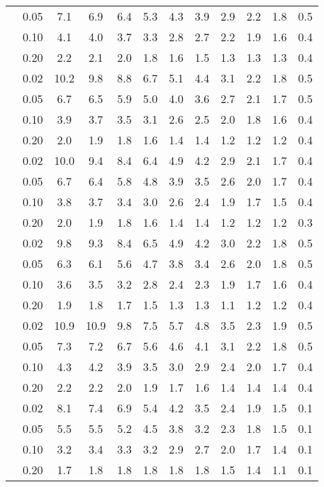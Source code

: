 \begin{tabular}{cccccccccccc}
 & 0.05 & 7.1 & 6.9 & 6.4 & 5.3 & 4.3 & 3.9 & 2.9 & 2.2 & 1.8 & 0.5 \\
 & 0.10 & 4.1 & 4.0 & 3.7 & 3.3 & 2.8 & 2.7 & 2.2 & 1.9 & 1.6 & 0.4 \\
 & 0.20 & 2.2 & 2.1 & 2.0 & 1.8 & 1.6 & 1.5 & 1.3 & 1.3 & 1.3 & 0.4 \\
\hline
[Cr/H] & 0.02 & 10.2 & 9.8 & 8.8 & 6.7 & 5.1 & 4.4 & 3.1 & 2.2 & 1.8 & 0.5 \\
 & 0.05 & 6.7 & 6.5 & 5.9 & 5.0 & 4.0 & 3.6 & 2.7 & 2.1 & 1.7 & 0.5 \\
 & 0.10 & 3.9 & 3.7 & 3.5 & 3.1 & 2.6 & 2.5 & 2.0 & 1.8 & 1.6 & 0.4 \\
 & 0.20 & 2.0 & 1.9 & 1.8 & 1.6 & 1.4 & 1.4 & 1.2 & 1.2 & 1.2 & 0.4 \\
\hline
[Mn/H] & 0.02 & 10.0 & 9.4 & 8.4 & 6.4 & 4.9 & 4.2 & 2.9 & 2.1 & 1.7 & 0.4 \\
 & 0.05 & 6.7 & 6.4 & 5.8 & 4.8 & 3.9 & 3.5 & 2.6 & 2.0 & 1.7 & 0.4 \\
 & 0.10 & 3.8 & 3.7 & 3.4 & 3.0 & 2.6 & 2.4 & 1.9 & 1.7 & 1.5 & 0.4 \\
 & 0.20 & 2.0 & 1.9 & 1.8 & 1.6 & 1.4 & 1.4 & 1.2 & 1.2 & 1.2 & 0.3 \\
\hline
[Fe/H] & 0.02 & 9.8 & 9.3 & 8.4 & 6.5 & 4.9 & 4.2 & 3.0 & 2.2 & 1.8 & 0.5 \\
 & 0.05 & 6.3 & 6.1 & 5.6 & 4.7 & 3.8 & 3.4 & 2.6 & 2.0 & 1.8 & 0.5 \\
 & 0.10 & 3.6 & 3.5 & 3.2 & 2.8 & 2.4 & 2.3 & 1.9 & 1.7 & 1.6 & 0.4 \\
 & 0.20 & 1.9 & 1.8 & 1.7 & 1.5 & 1.3 & 1.3 & 1.1 & 1.2 & 1.2 & 0.4 \\
\hline
[Co/H] & 0.02 & 10.9 & 10.9 & 9.8 & 7.5 & 5.7 & 4.8 & 3.5 & 2.3 & 1.9 & 0.5 \\
 & 0.05 & 7.3 & 7.2 & 6.7 & 5.6 & 4.6 & 4.1 & 3.1 & 2.2 & 1.8 & 0.5 \\
 & 0.10 & 4.3 & 4.2 & 3.9 & 3.5 & 3.0 & 2.9 & 2.4 & 2.0 & 1.7 & 0.4 \\
 & 0.20 & 2.2 & 2.2 & 2.0 & 1.9 & 1.7 & 1.6 & 1.4 & 1.4 & 1.4 & 0.4 \\
\hline
[Ba/H] & 0.02 & 8.1 & 7.4 & 6.9 & 5.4 & 4.2 & 3.5 & 2.4 & 1.9 & 1.5 & 0.1 \\
 & 0.05 & 5.5 & 5.5 & 5.2 & 4.5 & 3.8 & 3.2 & 2.3 & 1.8 & 1.5 & 0.1 \\
 & 0.10 & 3.2 & 3.4 & 3.3 & 3.2 & 2.9 & 2.7 & 2.0 & 1.7 & 1.4 & 0.1 \\
 & 0.20 & 1.7 & 1.8 & 1.8 & 1.8 & 1.8 & 1.8 & 1.5 & 1.4 & 1.1 & 0.1 \\
\hline
\hline
\end{tabular}
